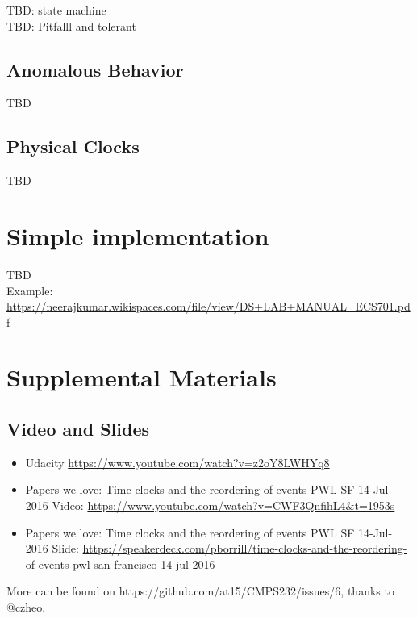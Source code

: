 \documentclass[12pt,a4paper,oneside]{article}
\begin{document}
TBD: state machine \\
TBD: Pitfalll and tolerant

\subsection{Anomalous Behavior}

TBD

\subsection{Physical Clocks}

TBD

\section{Simple implementation}

TBD \\
Example: \url{https://neerajkumar.wikispaces.com/file/view/DS+LAB+MANUAL_ECS701.pdf}

%
%

\section{Supplemental Materials}

\subsection{Video and Slides}

\begin{itemize}
  \item Udacity \url{https://www.youtube.com/watch?v=z2oY8LWHYq8}
  \item Papers we love: Time clocks and the reordering of events PWL SF 14-Jul-2016 Video: \url{https://www.youtube.com/watch?v=CWF3QnfihL4\&t=1953s}
  \item Papers we love: Time clocks and the reordering of events PWL SF 14-Jul-2016 Slide: \url{https://speakerdeck.com/pborrill/time-clocks-and-the-reordering-of-events-pwl-san-francisco-14-jul-2016}
\end{itemize}

More can be found on https://github.com/at15/CMPS232/issues/6, thanks to @czheo.
\end{document}
